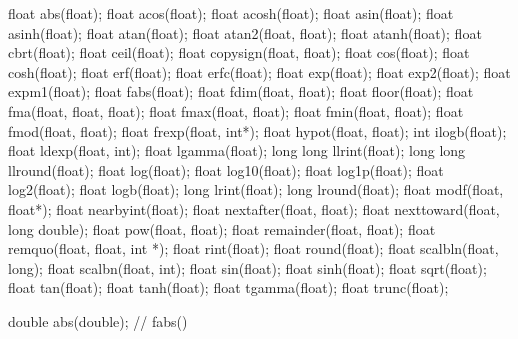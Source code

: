 \begin{codeblock}
float abs(float);
float acos(float);
float acosh(float);
float asin(float);
float asinh(float);
float atan(float);
float atan2(float, float);
float atanh(float);
float cbrt(float);
float ceil(float);
float copysign(float, float);
float cos(float);
float cosh(float);
float erf(float);
float erfc(float);
float exp(float);
float exp2(float);
float expm1(float);
float fabs(float);
float fdim(float, float);
float floor(float);
float fma(float, float, float);
float fmax(float, float);
float fmin(float, float);
float fmod(float, float);
float frexp(float, int*);
float hypot(float, float);
int ilogb(float);
float ldexp(float, int);
float lgamma(float);
long long llrint(float);
long long llround(float);
float log(float);
float log10(float);
float log1p(float);
float log2(float);
float logb(float);
long lrint(float);
long lround(float);
float modf(float, float*);
float nearbyint(float);
float nextafter(float, float);
float nexttoward(float, long double);
float pow(float, float);
float remainder(float, float);
float remquo(float, float, int *);
float rint(float);
float round(float);
float scalbln(float, long);
float scalbn(float, int);
float sin(float);
float sinh(float);
float sqrt(float);
float tan(float);
float tanh(float);
float tgamma(float);
float trunc(float);

double abs(double);            // fabs()


\end{codeblock}
